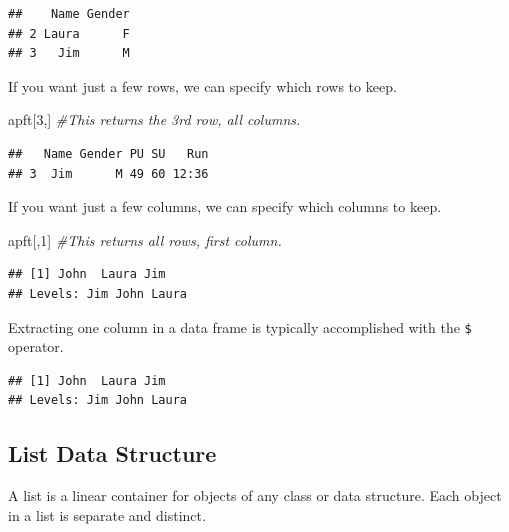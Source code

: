 \documentclass[]{book}
\newenvironment{Shaded}{\begin{snugshade}}{\end{snugshade}}
\newcommand{\DecValTok}[1]{\textcolor[rgb]{0.00,0.00,0.81}{{#1}}}
\newcommand{\CommentTok}[1]{\textcolor[rgb]{0.56,0.35,0.01}{\textit{{#1}}}}
\newcommand{\NormalTok}[1]{{#1}}
\begin{document}
\begin{verbatim}
##    Name Gender
## 2 Laura      F
## 3   Jim      M
\end{verbatim}

If you want just a few rows, we can specify which rows to keep.

\begin{Shaded}
\begin{Highlighting}[]
\NormalTok{apft[}\DecValTok{3}\NormalTok{,] }\CommentTok{#This returns the 3rd row, all columns.}
\end{Highlighting}
\end{Shaded}

\begin{verbatim}
##   Name Gender PU SU   Run
## 3  Jim      M 49 60 12:36
\end{verbatim}

If you want just a few columns, we can specify which columns to keep.

\begin{Shaded}
\begin{Highlighting}[]
\NormalTok{apft[,}\DecValTok{1}\NormalTok{] }\CommentTok{#This returns all rows, first column.}
\end{Highlighting}
\end{Shaded}

\begin{verbatim}
## [1] John  Laura Jim  
## Levels: Jim John Laura
\end{verbatim}

Extracting one column in a data frame is typically accomplished with the
\texttt{\$} operator.

\begin{Shaded}
\end{Shaded}

\begin{verbatim}
## [1] John  Laura Jim  
## Levels: Jim John Laura
\end{verbatim}

\subsection{List Data Structure}\label{list-data-structure}

A list is a linear container for objects of any class or data structure.
Each object in a list is separate and distinct.
\end{document}
